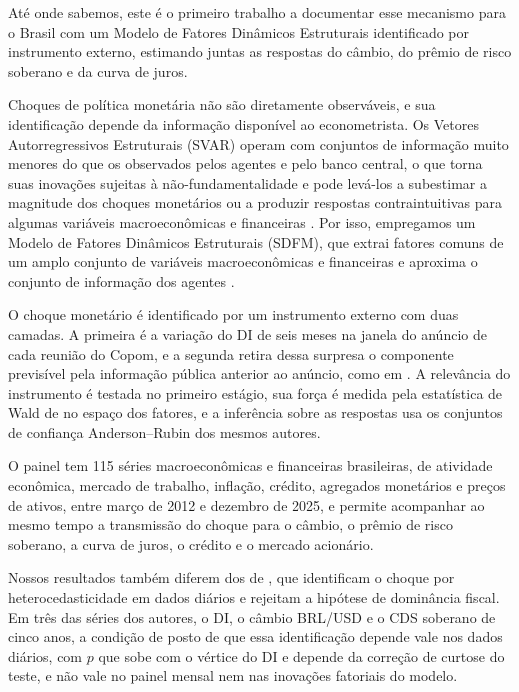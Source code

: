 \documentclass[preprint,authoryear,review,12pt]{elsarticle}
\begin{document}
Até onde sabemos, este é o primeiro trabalho a documentar esse mecanismo para o Brasil com um Modelo de Fatores Dinâmicos Estruturais identificado por instrumento externo, estimando juntas as respostas do câmbio, do prêmio de risco soberano e da curva de juros.

Choques de política monetária não são diretamente observáveis, e sua identificação depende da informação disponível ao econometrista. Os Vetores Autorregressivos Estruturais (SVAR) operam com conjuntos de informação muito menores do que os observados pelos agentes e pelo banco central, o que torna suas inovações sujeitas à não-fundamentalidade e pode levá-los a subestimar a magnitude dos choques monetários ou a produzir respostas contraintuitivas para algumas variáveis macroeconômicas e financeiras \citep[]{villaverde, alessi}. Por isso, empregamos um Modelo de Fatores Dinâmicos Estruturais (SDFM), que extrai fatores comuns de um amplo conjunto de variáveis macroeconômicas e financeiras e aproxima o conjunto de informação dos agentes \citep[]{STOCK2016415, alessi}.


O choque monetário é identificado por um instrumento externo com duas camadas. A primeira é a variação do DI de seis meses na janela do anúncio de cada reunião do Copom, e a segunda retira dessa surpresa o componente previsível pela informação pública anterior ao anúncio, como em \cite{bauer2023}. A relevância do instrumento é testada no primeiro estágio, sua força é medida pela estatística de Wald de \cite{montielolea} no espaço dos fatores, e a inferência sobre as respostas usa os conjuntos de confiança Anderson--Rubin dos mesmos autores.

O painel tem 115 séries macroeconômicas e financeiras brasileiras, de atividade econômica, mercado de trabalho, inflação, crédito, agregados monetários e preços de ativos, entre março de 2012 e dezembro de 2025, e permite acompanhar ao mesmo tempo a transmissão do choque para o câmbio, o prêmio de risco soberano, a curva de juros, o crédito e o mercado acionário.

Nossos resultados também diferem dos de \cite{goncalves2025}, que identificam o choque por heterocedasticidade em dados diários e rejeitam a hipótese de dominância fiscal. Em três das séries dos autores, o DI, o câmbio BRL/USD e o CDS soberano de cinco anos, a condição de posto de que essa identificação depende vale nos dados diários, com $p$ que sobe com o vértice do DI e depende da correção de curtose do teste, e não vale no painel mensal nem nas inovações fatoriais do modelo.
\end{document}
